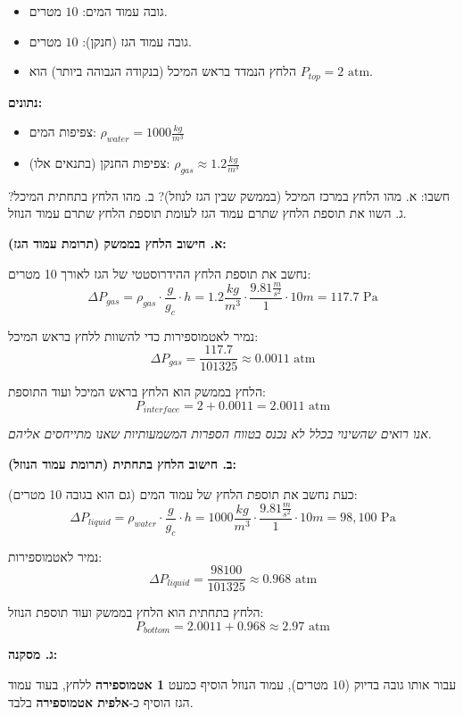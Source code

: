 \documentclass[
  hebrew,
  letterpaper,
  DIV=11,
  numbers=noendperiod]{scrreprt}
\providecommand{\tightlist}{%
  \setlength{\itemsep}{0pt}\setlength{\parskip}{0pt}}
\begin{document}
\begin{itemize}
\tightlist
\item
  גובה עמוד המים: \(10\) מטרים.
\item
  גובה עמוד הגז (חנקן): \(10\) מטרים.
\item
  הלחץ הנמדד בראש המיכל (בנקודה הגבוהה ביותר) הוא
  \(P_{top} = 2 \text{ atm}\).
\end{itemize}

\textbf{נתונים:}

\begin{itemize}
\tightlist
\item
  צפיפות המים: \(\rho_{water} = 1000 \frac{kg}{m^3}\)
\item
  צפיפות החנקן (בתנאים אלו): \(\rho_{gas} \approx 1.2 \frac{kg}{m^3}\)
\end{itemize}

חשבו: א. מהו הלחץ במרכז המיכל (בממשק שבין הגז לנוזל)? ב. מהו הלחץ בתחתית
המיכל? ג. השוו את תוספת הלחץ שתרם עמוד הגז לעומת תוספת הלחץ שתרם עמוד
הנוזל.

\begin{tcolorbox}[enhanced jigsaw, colback=white, arc=.35mm, coltitle=black, breakable, toptitle=1mm, leftrule=.75mm, colbacktitle=quarto-callout-note-color!10!white, opacitybacktitle=0.6, bottomtitle=1mm, titlerule=0mm, opacityback=0, colframe=quarto-callout-note-color-frame, title=\textcolor{quarto-callout-note-color}{\faInfo}\hspace{0.5em}{פתרון}, rightrule=.15mm, bottomrule=.15mm, toprule=.15mm, left=2mm]

\textbf{א. חישוב הלחץ בממשק (תרומת עמוד הגז):}

נחשב את תוספת הלחץ ההידרוסטטי של הגז לאורך 10 מטרים:
\[\Delta P_{gas} = \rho_{gas} \cdot \frac{g}{g_c} \cdot h = 1.2 \frac{kg}{m^3} \cdot \frac{9.81 \frac{m}{s^2}}{1} \cdot 10 m = 117.7 \text{ Pa}\]

נמיר לאטמוספירות כדי להשוות ללחץ בראש המיכל:
\[\Delta P_{gas} = \frac{117.7}{101325} \approx 0.0011 \text{ atm}\]

הלחץ בממשק הוא הלחץ בראש המיכל ועוד התוספת:
\[P_{interface} = 2 + 0.0011 = 2.0011 \text{ atm}\]

\emph{אנו רואים שהשינוי בכלל לא נכנס בטווח הספרות המשמעותיות שאנו
מתייחסים אליהם.}

\textbf{ב. חישוב הלחץ בתחתית (תרומת עמוד הנוזל):}

כעת נחשב את תוספת הלחץ של עמוד המים (גם הוא בגובה 10 מטרים):
\[\Delta P_{liquid} = \rho_{water} \cdot \frac{g}{g_c} \cdot h = 1000 \frac{kg}{m^3} \cdot \frac{9.81 \frac{m}{s^2}}{1} \cdot 10 m = 98,100 \text{ Pa}\]

נמיר לאטמוספירות:
\[\Delta P_{liquid} = \frac{98100}{101325} \approx 0.968 \text{ atm}\]

הלחץ בתחתית הוא הלחץ בממשק ועוד תוספת הנוזל:
\[P_{bottom} = 2.0011 + 0.968 \approx 2.97 \text{ atm}\]

\textbf{ג. מסקנה:}

עבור אותו גובה בדיוק (\(10\) מטרים), עמוד הנוזל הוסיף כמעט \textbf{1
אטמוספירה} ללחץ, בעוד עמוד הגז הוסיף כ-\textbf{אלפית אטמוספירה} בלבד.

\end{tcolorbox}
\end{document}
